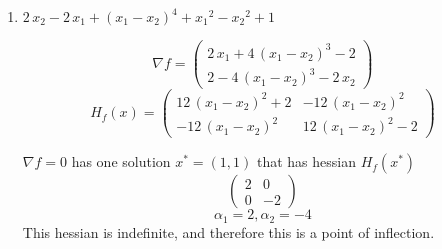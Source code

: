\begin{enumerate}
\item $2\,x_2 -2\,x_1 +{{\left(x_1 -x_2 \right)}}^4 +{x_1 }^2 -{x_2 }^2 +1$\par
\[
\nabla f = \left(\begin{array}{c}
2\,x_1 +4\,{{\left(x_1 -x_2 \right)}}^3 -2\\
2-4\,{{\left(x_1 -x_2 \right)}}^3 -2\,x_2 
\end{array}\right)
\]
\[
H_f(x) = \left(\begin{array}{cc}
12\,{{\left(x_1 -x_2 \right)}}^2 +2 & -12\,{{\left(x_1 -x_2 \right)}}^2 \\
-12\,{{\left(x_1 -x_2 \right)}}^2  & 12\,{{\left(x_1 -x_2 \right)}}^2 -2
\end{array}\right) 
\]

$\nabla f = 0$ has one solution $x^*=(1, 1)$ that has hessian $H_f(x^*)$
\[
\left(\begin{array}{cc}
2 & 0\\
0 & -2
\end{array}\right)
\]
\[
\alpha_1 = 2,\alpha_2 = -4
\]
This hessian is indefinite, and therefore this is a point of inflection.
\end{enumerate}

